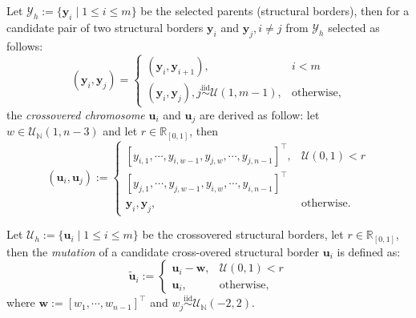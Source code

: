 \begin{defn}\label{defn:chromosome_crossover}
    Let $\mathscr{Y}_h:=\{\mathbf{y}_{i}\mid 1\leq i \leq m\}$ be the selected parents (structural borders), then for a candidate pair of two structural borders $\mathbf{y}_i$ and $\mathbf{y}_j, i\neq j$ from $\mathscr{Y}_h$ selected as follows:
    \begin{equation}
        (\mathbf{y}_i, \mathbf{y}_j)=\begin{cases}
            (\mathbf{y}_i,\mathbf{y}_{i+1}),&i< m\\
            (\mathbf{y}_i,\mathbf{y}_{j}), j\overset{\text{iid}}{\sim}\mathcal{U}(1,m-1),&\text{otherwise},
        \end{cases}
    \end{equation}
    the \textit{crossovered chromosome} $\mathbf{u}_i$ and $\mathbf{u}_j$ are derived as follow: let $w\in\mathcal{U}_{\mathbb{N}}(1,n-3)$ and let $r\in\mathbb{R}_{[0,1]}$, then
    \begin{equation}
        (\mathbf{u}_i,\mathbf{u}_j):=\begin{cases}
            [y_{i,1},\cdots,y_{i,w-1},y_{j,w},\cdots,y_{j,n-1}]^{\top},&\mathcal{U}(0,1)< r\\
            [y_{j,1},\cdots,y_{j,w-1},y_{i,w},\cdots,y_{i,n-1}]^{\top}&\\[0.3cm]
            \mathbf{y}_i,\mathbf{y}_j,&\text{otherwise}.
        \end{cases}
    \end{equation}
\end{defn}

\begin{defn}\label{defn:chromosome_mutation}
    Let $\mathscr{U}_h:=\{\mathbf{u}_{i}\mid 1\leq i \leq m\}$ be the crossovered structural borders, let $r\in\mathbb{R}_{[0,1]}$, then the \textit{mutation} of a candidate cross-overed structural border $\mathbf{u}_i$ is defined as:
    \begin{equation}
        \tilde{\mathbf{u}}_i:=\begin{cases}
            \mathbf{u}_i-\mathbf{w},&\mathcal{U}(0,1)< r\\
            \mathbf{u}_i,&\text{otherwise},
        \end{cases}
    \end{equation}
    where $\mathbf{w}:=[w_1,\cdots,w_{n-1}]^{\top}$ and $w_j\overset{\text{iid}}{\sim}\mathcal{U}_{\mathbb{N}}(-2,2)$.
\end{defn}

